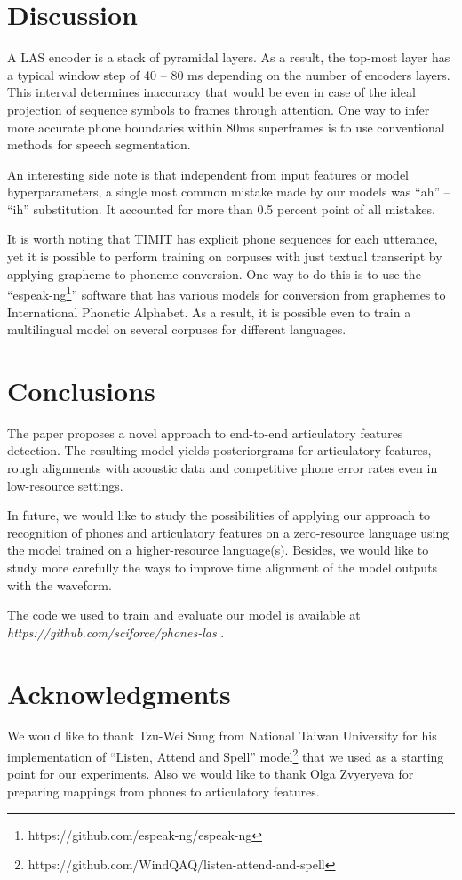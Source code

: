 \documentclass[a4paper]{article}
\begin{document}
\section{Discussion}
A LAS encoder is a stack of pyramidal layers. As a result, the top-most layer has a typical window step of 40 -- 80 ms depending on the number of encoders layers. This interval determines inaccuracy that would be even in case of the ideal projection of sequence symbols to frames through attention. One way to infer more accurate phone boundaries within 80ms superframes is to use conventional methods for speech segmentation.

An interesting side note is that independent from input features or model hyperparameters, a single most common mistake made by our models was ``ah'' -- ``ih'' substitution. It accounted for more than 0.5 percent point of all mistakes.

It is worth noting that TIMIT has explicit phone sequences for each utterance, yet it is possible to perform training on corpuses with just textual transcript by applying grapheme-to-phoneme conversion. One way to do this is to use the ``espeak-ng\footnote{https://github.com/espeak-ng/espeak-ng}'' software that has various models for conversion from graphemes to International Phonetic Alphabet. As a result, it is possible even to train a multilingual model on several corpuses for different languages.

\section{Conclusions}
The paper proposes a novel approach to end-to-end articulatory features detection. The resulting model yields posteriorgrams for articulatory features, rough alignments with acoustic data and competitive phone error rates even in low-resource settings.

In future, we would like to study the possibilities of applying our approach to recognition of phones and articulatory features on a zero-resource language using the model trained on a higher-resource language(s). Besides, we would like to study more carefully the ways to improve time alignment of the model outputs with the waveform.

The code we used to train and evaluate our model is available at \textit{https://github.com/sciforce/phones-las} .

\section{Acknowledgments}
We would like to thank Tzu-Wei Sung from National Taiwan University for his implementation of ``Listen, Attend and Spell'' model\footnote{https://github.com/WindQAQ/listen-attend-and-spell} that we used as a starting point for our experiments. Also we would like to thank Olga Zvyeryeva for preparing mappings from phones to articulatory features.
\end{document}
